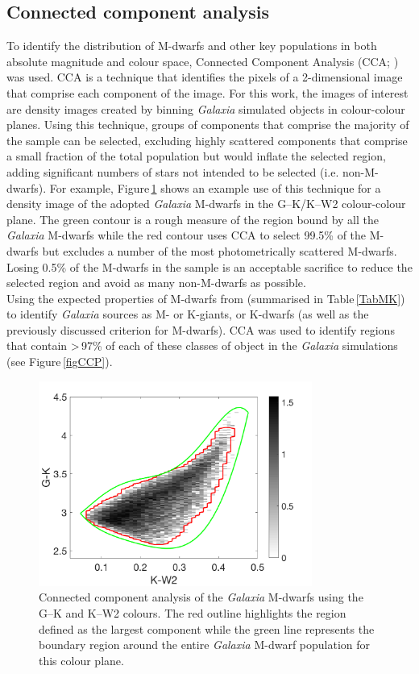 \subsection{Connected component analysis}
\label{secCCA}
To identify the distribution of M-dwarfs and other key populations in both absolute magnitude and colour space, Connected Component Analysis (CCA; \citealt{1988Samet}) was used. CCA is a technique that identifies the pixels of a 2-dimensional image that comprise each component of the image. For this work, the images of interest are density images created by binning {\em Galaxia} simulated objects in colour-colour planes. Using this technique, groups of components that comprise the majority of the sample can be selected, excluding highly scattered components that comprise a small fraction of the total population but would inflate the selected region, adding significant numbers of stars not intended to be selected (i.e. non-M-dwarfs). For example, Figure\,\ref{figCCA} shows an example use of this technique for a density image of the adopted {\em Galaxia} M-dwarfs in the G--K/K--W2 colour-colour plane. The green contour is a rough measure of the region bound by all the {\em Galaxia} M-dwarfs while the red contour uses CCA to select 99.5\% of the M-dwarfs but excludes a number of the most photometrically scattered M-dwarfs. Losing 0.5\% of the M-dwarfs in the sample is an acceptable sacrifice to reduce the selected region and avoid as many non-M-dwarfs as possible.\\

Using the expected properties of M-dwarfs from \citet{2005Reid} (summarised in Table\,\ref{TabMK}) to identify {\em Galaxia} sources as M- or K-giants, or K-dwarfs (as well as the previously discussed criterion for M-dwarfs). CCA was used to identify regions that contain \textgreater\,97\% of each of these classes of object in the {\em Galaxia} simulations (see Figure\,\ref{figCCP}).\\

\begin{figure}
	\centering
    \includegraphics[width=0.8\textwidth]{CCA-2.pdf}
    \caption{Connected component analysis of the {\em Galaxia} M-dwarfs using the G--K and K--W2 colours. The red outline highlights the region defined as the largest component while the green line represents the boundary region around the entire {\em Galaxia} M-dwarf population for this colour plane.}
    \label{figCCA}
\end{figure}

